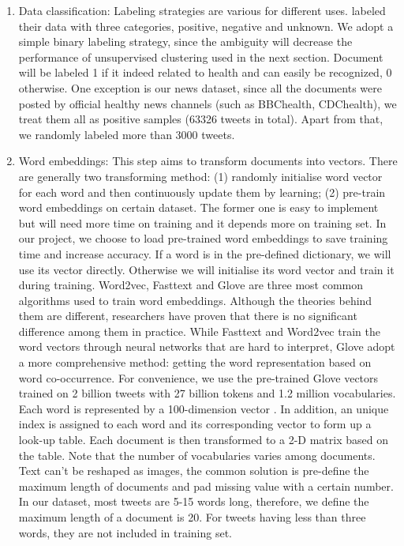 \begin{enumerate}
    \item Data classification: Labeling strategies are various for different uses. \cite{lampos2010flu} labeled their data with three categories, positive, negative and unknown. We adopt a simple binary labeling strategy, since the ambiguity will decrease the performance of unsupervised clustering used in the next section. Document will be labeled 1 if it indeed related to health and can easily be recognized, 0 otherwise. One exception is our news dataset, since all the documents were posted by official healthy news channels (such as BBChealth, CDChealth), we treat them all as positive samples (63326 tweets in total). Apart from that, we randomly labeled more than 3000 tweets.
    \item Word embeddings: This step aims to transform documents into vectors. There are generally two transforming method: (1) randomly initialise word vector for each word and then continuously update them by learning; (2) pre-train word embeddings on certain dataset. The former one is easy to implement but will need more time on training and it depends more on training set. In our project, we choose to load pre-trained word embeddings to save training time and increase accuracy. If a word is in the pre-defined dictionary, we will use its vector directly. Otherwise we will initialise its word vector and train it during training. Word2vec\cite{mikolov2013efficient}, Fasttext\cite{joulin2016bag} and Glove \cite{pennington2014glove} are three most common algorithms used to train word embeddings. Although the theories behind them are different, researchers have proven that there is no significant difference among them in practice. While Fasttext and Word2vec train the word vectors through neural networks that are hard to interpret, Glove adopt a more comprehensive method: getting the word representation based on word co-occurrence. For convenience, we use the pre-trained Glove vectors trained on 2 billion tweets with 27 billion tokens and 1.2 million vocabularies. Each word is represented by a 100-dimension vector \cite{pennington2014glove}. In addition, an unique index is assigned to each word and its corresponding vector to form up a look-up table. Each document is then transformed to a 2-D matrix based on the table. Note that the number of vocabularies varies among documents. Text can't be reshaped as images, the common solution is pre-define the maximum length of documents and pad missing value with a certain number. In our dataset, most tweets are 5-15 words long, therefore, we define the maximum length of a document is 20. For tweets having less than three words, they are not included in training set.

\end{enumerate}
